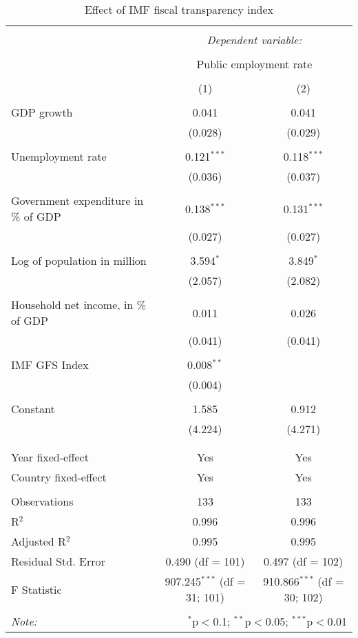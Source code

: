 
\begin{table}[!htbp] \centering 
  \caption{Effect of IMF fiscal transparency index} 
  \label{} 
\begin{tabular}{@{\extracolsep{5pt}}lcc} 
\\[-1.8ex]\hline 
\hline \\[-1.8ex] 
 & \multicolumn{2}{c}{\textit{Dependent variable:}} \\ 
\cline{2-3} 
\\[-1.8ex] & \multicolumn{2}{c}{Public employment rate} \\ 
\\[-1.8ex] & (1) & (2)\\ 
\hline \\[-1.8ex] 
 GDP growth & 0.041 & 0.041 \\ 
  & (0.028) & (0.029) \\ 
  & & \\ 
 Unemployment rate & 0.121$^{***}$ & 0.118$^{***}$ \\ 
  & (0.036) & (0.037) \\ 
  & & \\ 
 Government expenditure in \% of GDP & 0.138$^{***}$ & 0.131$^{***}$ \\ 
  & (0.027) & (0.027) \\ 
  & & \\ 
 Log of population in million & 3.594$^{*}$ & 3.849$^{*}$ \\ 
  & (2.057) & (2.082) \\ 
  & & \\ 
 Household net income, in \% of GDP & 0.011 & 0.026 \\ 
  & (0.041) & (0.041) \\ 
  & & \\ 
 IMF GFS Index & 0.008$^{**}$ &  \\ 
  & (0.004) &  \\ 
  & & \\ 
 Constant & 1.585 & 0.912 \\ 
  & (4.224) & (4.271) \\ 
  & & \\ 
\hline \\[-1.8ex] 
Year fixed-effect & Yes & Yes \\ 
Country fixed-effect & Yes & Yes \\ 
\hline \\[-1.8ex] 
Observations & 133 & 133 \\ 
R$^{2}$ & 0.996 & 0.996 \\ 
Adjusted R$^{2}$ & 0.995 & 0.995 \\ 
Residual Std. Error & 0.490 (df = 101) & 0.497 (df = 102) \\ 
F Statistic & 907.245$^{***}$ (df = 31; 101) & 910.866$^{***}$ (df = 30; 102) \\ 
\hline 
\hline \\[-1.8ex] 
\textit{Note:}  & \multicolumn{2}{r}{$^{*}$p$<$0.1; $^{**}$p$<$0.05; $^{***}$p$<$0.01} \\ 
\end{tabular} 
\end{table} 
